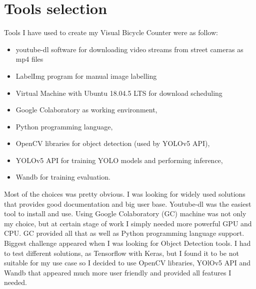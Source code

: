 \section{Tools selection}
\label{sec:tools}

Tools I have used to create my Visual Bicycle Counter were as follow:
\begin{itemize}
    \item youtube-dl software for downloading video streams from street cameras as mp4 files
    \item LabelImg program for manual image labelling 
    \item Virtual Machine with Ubuntu 18.04.5 LTS for download scheduling 
    \item Google Colaboratory as working environment,
    \item Python programming language,
    \item OpenCV libraries for object detection (used by YOLOv5 API),
    \item YOLOv5 API for training YOLO\cite{Redmon_2016_CVPR} models and performing inference,
    \item Wandb for training evaluation.
\end{itemize}
Most of the choices was pretty obvious. I was looking for widely used solutions that provides good documentation and big user base. Youtube-dl was the easiest tool to install and use. Using Google Colaboratory (GC) machine was not only my choice, but at certain stage of work I simply needed more powerful GPU and CPU. GC provided all that as well as Python programming language support. Biggest challenge appeared when I was looking for Object Detection tools. I had to test different solutions, as Tensorflow with Keras, but I found it to be not suitable for my use case so I decided to use OpenCV libraries, YOlOv5 API and Wandb that appeared much more user friendly and provided all features I needed.
